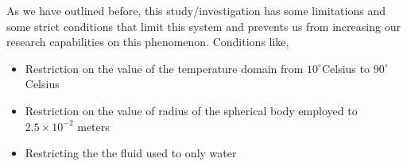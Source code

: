 {As we have outlined before, this study/investigation has some limitations and some strict conditions that limit this system and prevents us from increasing our research capabilities on this phenomenon. Conditions like,}
        
    \begin{itemize}
        \item {Restriction on the value of the temperature domain from $10^\circ$Celsius to $90^\circ$Celsius}
        \item {Restriction on the value of radius of the spherical body employed to $2.5\times10^{-2}$ meters}
        \item {Restricting the the fluid used to only water}
    \end{itemize}
        
        

